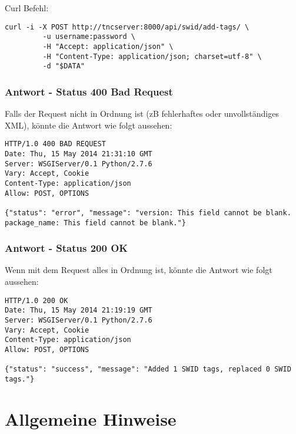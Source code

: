 \documentclass[10pt,a4paper]{scrartcl}
\begin{document}
Curl Befehl:

\begin{small}\begin{lstlisting}
curl -i -X POST http://tncserver:8000/api/swid/add-tags/ \
		 -u username:password \
		 -H "Accept: application/json" \
		 -H "Content-Type: application/json; charset=utf-8" \
		 -d "$DATA"
\end{lstlisting}\end{small}


\subsubsection{Antwort - Status 400 Bad Request}

Falls der Request nicht in Ordnung ist (zB fehlerhaftes oder unvollständiges
XML), könnte die Antwort wie folgt aussehen:

\begin{small}\begin{lstlisting}
HTTP/1.0 400 BAD REQUEST
Date: Thu, 15 May 2014 21:31:10 GMT
Server: WSGIServer/0.1 Python/2.7.6
Vary: Accept, Cookie
Content-Type: application/json
Allow: POST, OPTIONS

{"status": "error", "message": "version: This field cannot be blank.
package_name: This field cannot be blank."}
\end{lstlisting}\end{small}


\subsubsection{Antwort - Status 200 OK}

Wenn mit dem Request alles in Ordnung ist, könnte die Antwort wie folgt aussehen:

\begin{small}\begin{lstlisting}
HTTP/1.0 200 OK
Date: Thu, 15 May 2014 21:19:19 GMT
Server: WSGIServer/0.1 Python/2.7.6
Vary: Accept, Cookie
Content-Type: application/json
Allow: POST, OPTIONS

{"status": "success", "message": "Added 1 SWID tags, replaced 0 SWID tags."}
\end{lstlisting}\end{small}


\newpage
\section{Allgemeine Hinweise}
\end{document}
